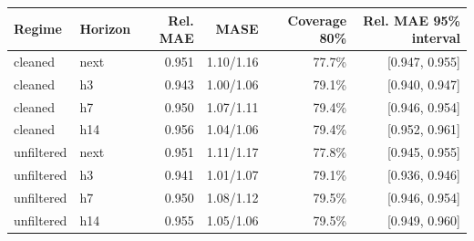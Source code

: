 \begin{tabular}{@{}llrrrr@{}}\toprule
Regime & Horizon & Rel. MAE & MASE & Coverage 80\% & Rel. MAE 95\% interval\\\midrule
cleaned & next & 0.951 & 1.10/1.16 & 77.7\% & [0.947, 0.955] \\
cleaned & h3 & 0.943 & 1.00/1.06 & 79.1\% & [0.940, 0.947] \\
cleaned & h7 & 0.950 & 1.07/1.11 & 79.4\% & [0.946, 0.954] \\
cleaned & h14 & 0.956 & 1.04/1.06 & 79.4\% & [0.952, 0.961] \\
unfiltered & next & 0.951 & 1.11/1.17 & 77.8\% & [0.945, 0.955] \\
unfiltered & h3 & 0.941 & 1.01/1.07 & 79.1\% & [0.936, 0.946] \\
unfiltered & h7 & 0.950 & 1.08/1.12 & 79.5\% & [0.946, 0.954] \\
unfiltered & h14 & 0.955 & 1.05/1.06 & 79.5\% & [0.949, 0.960] \\
\bottomrule\end{tabular}
